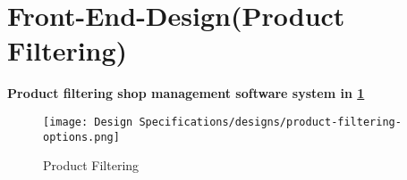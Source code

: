 \section{Front-End-Design(Product Filtering)}
\vspace{1 cm}
\textbf{Product filtering shop management software system in \ref{fig:fig 5.9}}\\
\begin{figure}[ht]
    \centering  
    \texttt{[image: Design Specifications/designs/product-filtering-options.png]}    
    \caption{Product Filtering}
    \label{fig:fig 5.9}
\end{figure}